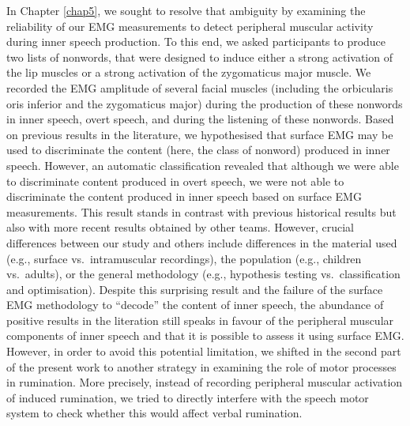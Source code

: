 \documentclass[a4paper,12pt,twoside,openright,oldfontcommands,final]{memoir}
\begin{document}
In Chapter \ref{chap5}, we sought to resolve that ambiguity by examining the reliability of our EMG measurements to detect peripheral muscular activity during inner speech production. To this end, we asked participants to produce two lists of nonwords, that were designed to induce either a strong activation of the lip muscles or a strong activation of the zygomaticus major muscle. We recorded the EMG amplitude of several facial muscles (including the orbicularis oris inferior and the zygomaticus major) during the production of these nonwords in inner speech, overt speech, and during the listening of these nonwords. Based on previous results in the literature, we hypothesised that surface EMG may be used to discriminate the content (here, the class of nonword) produced in inner speech. However, an automatic classification revealed that although we were able to discriminate content produced in overt speech, we were not able to discriminate the content produced in inner speech based on surface EMG measurements. This result stands in contrast with previous historical results but also with more recent results obtained by other teams. However, crucial differences between our study and others include differences in the material used (e.g., surface vs.~intramuscular recordings), the population (e.g., children vs.~adults), or the general methodology (e.g., hypothesis testing vs.~classification and optimisation). Despite this surprising result and the failure of the surface EMG methodology to \enquote{decode} the content of inner speech, the abundance of positive results in the literation still speaks in favour of the peripheral muscular components of inner speech and that it is possible to assess it using surface EMG. However, in order to avoid this potential limitation, we shifted in the second part of the present work to another strategy in examining the role of motor processes in rumination. More precisely, instead of recording peripheral muscular activation of induced rumination, we tried to directly interfere with the speech motor system to check whether this would affect verbal rumination.
\end{document}
